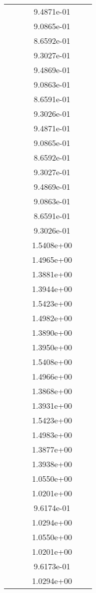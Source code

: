 \begin{xltabular}{\textwidth}{r|rS[table-format=1.3e+2]S[table-format=1.4e+2]S[table-format=1.4e+2]S[table-format=-1.5]}
&  &  & 9.4871e-01 & & \\
&  &  & 9.0865e-01 & & \\
&  &  & 8.6592e-01 & & \\
&  &  & 9.3027e-01 & & \\
&  &  & 9.4869e-01 & & \\
&  &  & 9.0863e-01 & & \\
&  &  & 8.6591e-01 & & \\
&  &  & 9.3026e-01 & & \\
&  &  & 9.4871e-01 & & \\
&  &  & 9.0865e-01 & & \\
&  &  & 8.6592e-01 & & \\
&  &  & 9.3027e-01 & & \\
&  &  & 9.4869e-01 & & \\
&  &  & 9.0863e-01 & & \\
&  &  & 8.6591e-01 & & \\
&  &  & 9.3026e-01 & & \\
&  &  & 1.5408e+00 & & \\
&  &  & 1.4965e+00 & & \\
&  &  & 1.3881e+00 & & \\
&  &  & 1.3944e+00 & & \\
&  &  & 1.5423e+00 & & \\
&  &  & 1.4982e+00 & & \\
&  &  & 1.3890e+00 & & \\
&  &  & 1.3950e+00 & & \\
&  &  & 1.5408e+00 & & \\
&  &  & 1.4966e+00 & & \\
&  &  & 1.3868e+00 & & \\
&  &  & 1.3931e+00 & & \\
&  &  & 1.5423e+00 & & \\
&  &  & 1.4983e+00 & & \\
&  &  & 1.3877e+00 & & \\
&  &  & 1.3938e+00 & & \\
&  &  & 1.0550e+00 & & \\
&  &  & 1.0201e+00 & & \\
&  &  & 9.6174e-01 & & \\
&  &  & 1.0294e+00 & & \\
&  &  & 1.0550e+00 & & \\
&  &  & 1.0201e+00 & & \\
&  &  & 9.6173e-01 & & \\
&  &  & 1.0294e+00 & & \\

\end{xltabular}
